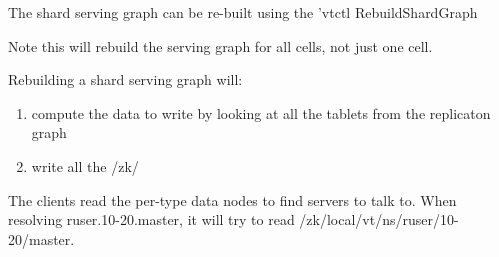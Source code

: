 The shard serving graph can be re-built using the 'vtctl RebuildShardGraph 

Note this will rebuild the serving graph for all cells, not just one cell.

Rebuilding a shard serving graph will:

\begin{enumerate}
\item compute the data to write by looking at all the tablets from the replicaton graph
\item  write all the /zk/
\end{enumerate}

The clients read the per-type data nodes to find servers to talk to. When resolving ruser.10-20.master, it will try to read /zk/local/vt/ns/ruser/10-20/master.

